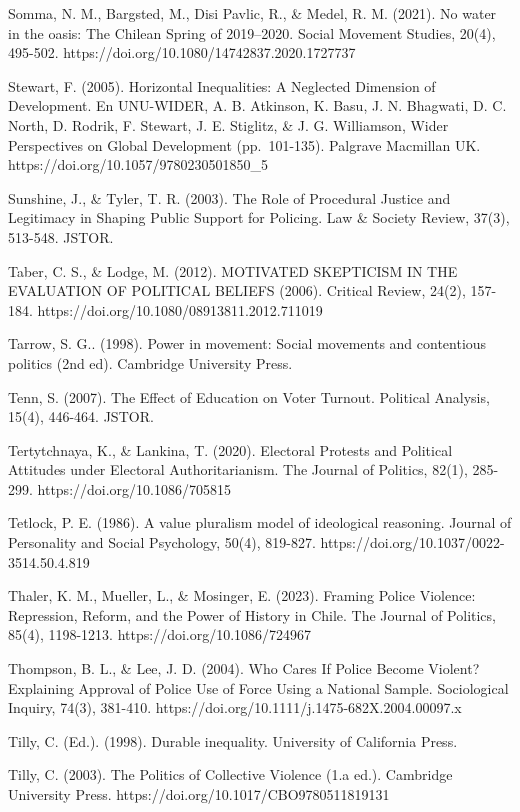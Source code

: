 \documentclass[
  13pt,
]{article}
\begin{document}
Somma, N. M., Bargsted, M., Disi Pavlic, R., \& Medel, R. M. (2021). No
water in the oasis: The Chilean Spring of 2019--2020. Social Movement
Studies, 20(4), 495-502. https://doi.org/10.1080/14742837.2020.1727737

Stewart, F. (2005). Horizontal Inequalities: A Neglected Dimension of
Development. En UNU-WIDER, A. B. Atkinson, K. Basu, J. N. Bhagwati, D.
C. North, D. Rodrik, F. Stewart, J. E. Stiglitz, \& J. G. Williamson,
Wider Perspectives on Global Development (pp.~101-135). Palgrave
Macmillan UK. https://doi.org/10.1057/9780230501850\_5

Sunshine, J., \& Tyler, T. R. (2003). The Role of Procedural Justice and
Legitimacy in Shaping Public Support for Policing. Law \& Society
Review, 37(3), 513-548. JSTOR.

Taber, C. S., \& Lodge, M. (2012). MOTIVATED SKEPTICISM IN THE
EVALUATION OF POLITICAL BELIEFS (2006). Critical Review, 24(2), 157-184.
https://doi.org/10.1080/08913811.2012.711019

Tarrow, S. G.. (1998). Power in movement: Social movements and
contentious politics (2nd ed). Cambridge University Press.

Tenn, S. (2007). The Effect of Education on Voter Turnout. Political
Analysis, 15(4), 446-464. JSTOR.

Tertytchnaya, K., \& Lankina, T. (2020). Electoral Protests and
Political Attitudes under Electoral Authoritarianism. The Journal of
Politics, 82(1), 285-299. https://doi.org/10.1086/705815

Tetlock, P. E. (1986). A value pluralism model of ideological reasoning.
Journal of Personality and Social Psychology, 50(4), 819-827.
https://doi.org/10.1037/0022-3514.50.4.819

Thaler, K. M., Mueller, L., \& Mosinger, E. (2023). Framing Police
Violence: Repression, Reform, and the Power of History in Chile. The
Journal of Politics, 85(4), 1198-1213. https://doi.org/10.1086/724967

Thompson, B. L., \& Lee, J. D. (2004). Who Cares If Police Become
Violent? Explaining Approval of Police Use of Force Using a National
Sample. Sociological Inquiry, 74(3), 381-410.
https://doi.org/10.1111/j.1475-682X.2004.00097.x

Tilly, C. (Ed.). (1998). Durable inequality. University of California
Press.

Tilly, C. (2003). The Politics of Collective Violence (1.a ed.).
Cambridge University Press. https://doi.org/10.1017/CBO9780511819131
\end{document}
